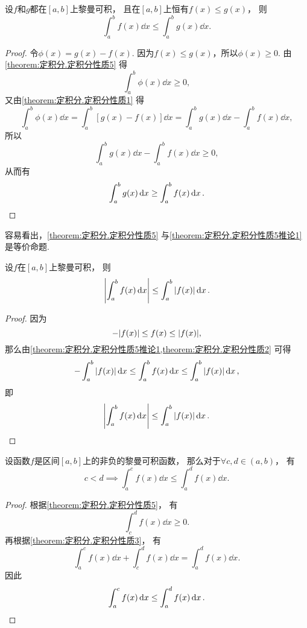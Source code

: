 \begin{corollary}\label{theorem:定积分.定积分性质5推论1}
设\(f\)和\(g\)都在\([a,b]\)上黎曼可积，
且在\([a,b]\)上恒有\(f(x) \leq g(x)\)，
则\[
	\int_a^b f(x) \dd{x} \leq \int_a^b g(x) \dd{x}.
\]
\begin{proof}
令\(\phi(x) = g(x) - f(x)\).
因为\(f(x) \leq g(x)\)，所以\(\phi(x) \geq 0\).
由\cref{theorem:定积分.定积分性质5} 得\[
	\int_a^b \phi(x) \dd{x} \geq 0,
\]
又由\cref{theorem:定积分.定积分性质1} 得\[
	\int_a^b \phi(x) \dd{x}
	= \int_a^b [g(x) - f(x)] \dd{x}
	= \int_a^b g(x) \dd{x} - \int_a^b f(x) \dd{x},
\]
所以\[
	\int_a^b g(x) \dd{x} - \int_a^b f(x) \dd{x} \geq 0,
\]
从而有\[
	\int_a^b g(x) \dd{x} \geq \int_a^b f(x) \dd{x}.
	\qedhere
\]
\end{proof}
\end{corollary}
\begin{remark}
容易看出，\cref{theorem:定积分.定积分性质5}
与\cref{theorem:定积分.定积分性质5推论1}
是等价命题.
\end{remark}

\begin{corollary}\label{theorem:定积分.定积分性质5推论2}
设\(f\)在\([a,b]\)上黎曼可积，
则\begin{equation}
	\abs{\int_a^b f(x) \dd{x}} \leq \int_a^b \abs{f(x)} \dd{x}.
\end{equation}
\begin{proof}
因为\[
	-\abs{f(x)} \leq f(x) \leq \abs{f(x)},
\]
那么由\cref{theorem:定积分.定积分性质5推论1,theorem:定积分.定积分性质2} 可得\[
	-\int_a^b \abs{f(x)} \dd{x}
	\leq
	\int_a^b f(x) \dd{x}
	\leq
	\int_a^b \abs{f(x)} \dd{x},
\]
即\[
	\abs{\int_a^b f(x) \dd{x}} \leq \int_a^b \abs{f(x)} \dd{x}.
	\qedhere
\]
\end{proof}
\end{corollary}

\begin{corollary}\label{theorem:定积分.定积分性质5推论3}
设函数\(f\)是区间\([a,b]\)上的非负的黎曼可积函数，
那么对于\(\forall c,d\in(a,b)\)，
有\[
	c<d
	\implies
	\int_a^c f(x) \dd{x} \leq \int_a^d f(x) \dd{x}.
\]
\begin{proof}
根据\cref{theorem:定积分.定积分性质5}，
有\[
	\int_c^d f(x) \dd{x} \geq 0.
\]
再根据\cref{theorem:定积分.定积分性质3}，
有\[
	\int_a^c f(x) \dd{x}
	+ \int_c^d f(x) \dd{x}
	= \int_a^d f(x) \dd{x}.
\]
因此\[
	\int_a^c f(x) \dd{x}
	\leq
	\int_a^d f(x) \dd{x}.
	\qedhere
\]
\end{proof}
\end{corollary}

